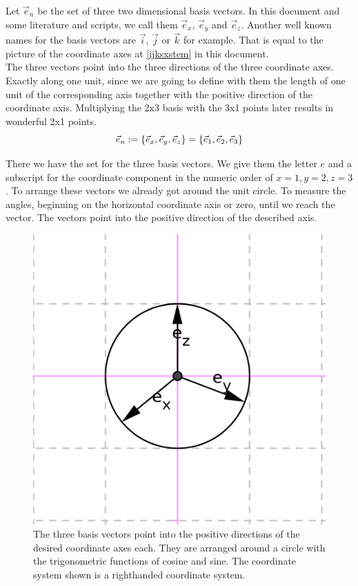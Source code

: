 \documentclass[a4paper]{article}
\begin{document}
Let $\vec{e}_{n}$ be the set of three two dimensional basis vectors. In this document and some literature and scripts,
we call them $\vec{e}_x$, $\vec{e}_y$ and $\vec{e}_z$. Another well known names for the basis vectors are $\vec{i}$, 
$\vec{j}$ or $\vec{k}$ for example. That is equal to the picture of the coordinate axes at \ref{ijksxstem} in this document.\\

The three vectors point into the three directions of the three coordinate axes. Exactly along one unit, since we are going
to define with them the length of one unit of the corresponding axis together with the positive direction of the coordinate axis.
Multiplying the 2x3 basis with the 3x1 points later results in wonderful 2x1 points. \\

\begin{displaymath}
\vec{e}_{n} := \{\vec{e}_x, \vec{e}_y, \vec{e}_z\} = \{\vec{e}_1, \vec{e}_2, \vec{e}_3\}\\
\end{displaymath} 

There we have the set for the three basis vectors. We give them the letter $e$ and a subscript for the coordinate component in the numeric order of $x=1, y=2, z=3$. To arrange these vectors we already got around the unit circle. To measure the angles, beginning on the horizontal coordinate axis or zero, until we reach the vector. The vectors point into the positive direction of the described axis.\\

\begin{figure}[ht]
\includegraphics[scale=1]{unitvectors.png}
\caption{The three basis vectors point into the positive directions of the desired coordinate axes each. They are arranged around a circle with the trigonometric functions of cosine and sine. The coordinate system shown is a righthanded coordinate system.}
\end{figure}
\end{document}

